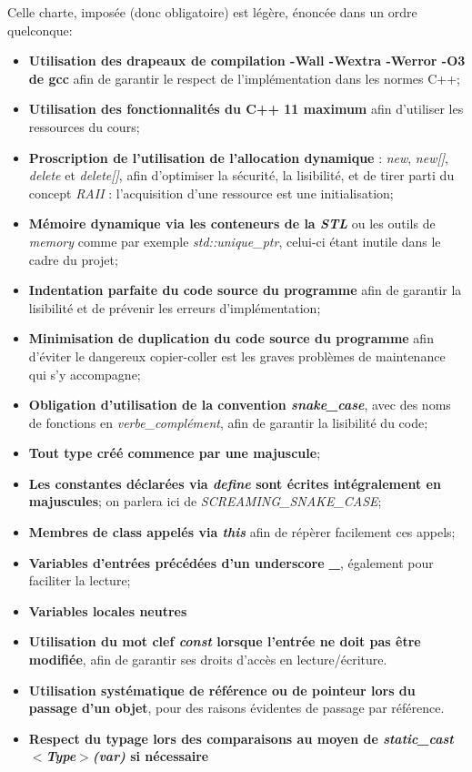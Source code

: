 \documentclass[9pts]{article}
\begin{document}
Celle charte, imposée (donc obligatoire) est légère, énoncée dans un ordre quelconque:
\begin{itemize}
\item \textbf{Utilisation des drapeaux de compilation -Wall -Wextra -Werror -O3 de gcc} afin de garantir le respect de l'implémentation dans les normes C++;
\item \textbf{Utilisation des fonctionnalités du C++ 11 maximum} afin d'utiliser les ressources du cours; %
\item \textbf{Proscription de l'utilisation de l'allocation dynamique} : \emph{new}, \emph{new[]}, \emph{delete} et \emph{delete[]}, afin d'optimiser la sécurité, la lisibilité, et de tirer parti du concept \emph{RAII} : l'acquisition d'une ressource est une initialisation;
\item \textbf{Mémoire dynamique via les conteneurs de la \emph{STL}} ou les outils de \emph{memory} comme par exemple \emph{std::unique\_ptr}, celui-ci étant inutile dans le cadre du projet;
\item \textbf{Indentation parfaite du code source du programme} afin de garantir la lisibilité et de prévenir les erreurs d'implémentation;
\item \textbf{Minimisation de duplication du code source du programme} afin d'éviter le dangereux copier-coller est les graves problèmes de maintenance qui s'y accompagne;
\item \textbf{Obligation d'utilisation de la convention \emph{snake\_case}}, avec des noms de fonctions en \emph{verbe\_complément}, afin de garantir la lisibilité du code;
\item \textbf{Tout type créé commence par une majuscule}; %
\item \textbf{Les constantes déclarées via \emph{define} sont écrites intégralement en majuscules}; on parlera ici de \emph{SCREAMING\_SNAKE\_CASE};
\item \textbf{Membres de class appelés via \emph{this}} afin de répèrer facilement ces appels;
\item \textbf{Variables d'entrées précédées d'un underscore \emph{\_}}, également pour faciliter la lecture;
\item \textbf{Variables locales neutres} %
\item \textbf{Utilisation du mot clef \emph{const} lorsque l'entrée ne doit pas être modifiée}, afin de garantir ses droits d'accès en lecture/écriture.
\item \textbf{Utilisation systématique de référence ou de pointeur lors du passage d'un objet}, pour des raisons évidentes de passage par référence.
\item \textbf{Respect du typage lors des comparaisons au moyen de \emph{static\_cast$<$Type$>$(var)} si nécessaire}
\end{itemize}
\end{document}
